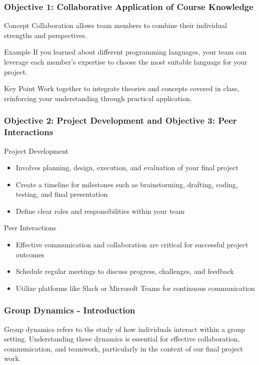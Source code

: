 \documentclass[aspectratio=169]{beamer}
\begin{document}
\begin{frame}[fragile]
    \frametitle{Objective 1: Collaborative Application of Course Knowledge}
    \begin{block}{Concept}
        Collaboration allows team members to combine their individual strengths and perspectives. 
    \end{block}
    \begin{block}{Example}
        If you learned about different programming languages, your team can leverage each member’s expertise to choose the most suitable language for your project.
    \end{block}
    \begin{block}{Key Point}
        Work together to integrate theories and concepts covered in class, reinforcing your understanding through practical application.
    \end{block}
\end{frame}

\begin{frame}[fragile]
    \frametitle{Objective 2: Project Development and Objective 3: Peer Interactions}
    \begin{block}{Project Development}
        \begin{itemize}
            \item Involves planning, design, execution, and evaluation of your final project
            \item Create a timeline for milestones such as brainstorming, drafting, coding, testing, and final presentation
            \item Define clear roles and responsibilities within your team
        \end{itemize}
    \end{block}
    \begin{block}{Peer Interactions}
        \begin{itemize}
            \item Effective communication and collaboration are critical for successful project outcomes
            \item Schedule regular meetings to discuss progress, challenges, and feedback
            \item Utilize platforms like Slack or Microsoft Teams for continuous communication
        \end{itemize}
    \end{block}
\end{frame}

\begin{frame}[fragile]
    \frametitle{Group Dynamics - Introduction}
    Group dynamics refers to the study of how individuals interact within a group setting. 
    Understanding these dynamics is essential for effective collaboration, communication, and teamwork, 
    particularly in the context of our final project work.
\end{frame}
\end{document}
